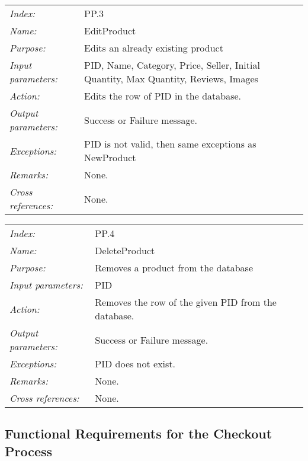 \documentclass[10pt,letter]{article}
\begin{document}
\begin{tabularx}{\textwidth}{l X}
    \it{Index:} & PP.3 \\
    \it{Name:} & EditProduct \\
    \it{Purpose:} & Edits an already existing product \\
    \it{Input parameters:} & PID, Name, Category, Price, Seller, Initial Quantity, Max Quantity, Reviews, Images\\
    \it{Action:} & Edits the row of PID in the database.\\
    \it{Output parameters:} & Success or Failure message. \\
    \it{Exceptions:} & PID is not valid, then same exceptions as NewProduct \\
    \it{Remarks:} & None. \\
    \it{Cross references:} & None. \\
    \hline
\end{tabularx}

\begin{tabularx}{\textwidth}{l X}
    \it{Index:} & PP.4 \\
    \it{Name:} & DeleteProduct \\
    \it{Purpose:} & Removes a product from the database\\
    \it{Input parameters:} & PID\\
    \it{Action:} & Removes the row of the given PID from the database.\\
    \it{Output parameters:} & Success or Failure message. \\
    \it{Exceptions:} & PID does not exist. \\
    \it{Remarks:} & None. \\
    \it{Cross references:} & None. \\
    \hline
\end{tabularx}

\subsection{Functional Requirements for the Checkout Process}
\end{document}
